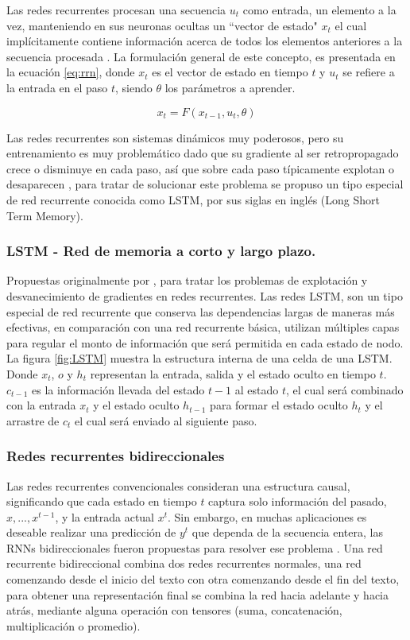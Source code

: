 Las redes recurrentes procesan una secuencia $u_t$ como entrada, un elemento a la vez, manteniendo en sus neuronas ocultas un ``vector de estado" $x_t$ el cual implícitamente contiene información acerca de todos los elementos anteriores a la secuencia procesada \cite{lecun2015deep}. La formulación general de este concepto, es presentada en la ecuación \ref{eq:rrn}, donde $x_t$ es el vector de estado en tiempo $t$ y $u_t$ se refiere a la entrada en el paso $t$, siendo $\theta$ los parámetros a aprender.


\begin{equation} \label{eq:rrn}
    x_t = F(x_{t-1}, u_t, \theta )
\end{equation}


Las redes recurrentes son sistemas dinámicos muy poderosos, pero su entrenamiento es muy problemático dado que su gradiente al ser retropropagado crece o disminuye en cada paso, así que sobre cada paso típicamente explotan o desaparecen \citep{lecun2015deep}, para tratar de solucionar este problema se propuso un tipo especial de red recurrente conocida como LSTM, por sus siglas en inglés (Long Short Term Memory).

\subsubsection{LSTM - Red de memoria a corto y largo plazo.}
Propuestas originalmente por \citep{hochreiter1997long}, para tratar los problemas de explotación y desvanecimiento de gradientes en redes recurrentes. Las redes LSTM, son un tipo especial de red recurrente que conserva las dependencias largas de maneras más efectivas, en comparación con una red recurrente básica, utilizan múltiples capas para regular el monto de información que será permitida en cada estado de nodo. La figura \ref{fig:LSTM} muestra la estructura interna de una celda de una LSTM. Donde $x_t$, $o$ y $h_t$ representan la entrada, salida y el estado oculto en tiempo $t$. $c_{t-1}$ es la información llevada del estado $t-1$ al estado $t$, el cual será combinado con la entrada $x_t$ y el estado oculto $h_{t-1}$ para formar el estado oculto $h_t$ y el arrastre de $c_t$ el cual será enviado al siguiente paso.




\subsubsection{Redes recurrentes bidireccionales}
Las redes recurrentes convencionales consideran una estructura causal, significando que cada estado en tiempo $t$ captura solo información del pasado, $x,..., x^{t-1}$, y la entrada actual $x^t$. Sin embargo, en muchas aplicaciones es deseable realizar una predicción de $y^t$ que dependa de la secuencia entera, las RNNs bidireccionales fueron propuestas para resolver ese problema \citep{schuster1997bidirectional}. Una red recurrente bidireccional combina dos redes recurrentes normales, una red comenzando desde el inicio del texto con otra comenzando desde el fin del texto, para obtener una representación final se combina la red hacia adelante y hacia atrás, mediante alguna operación con tensores (suma, concatenación, multiplicación o promedio). 

